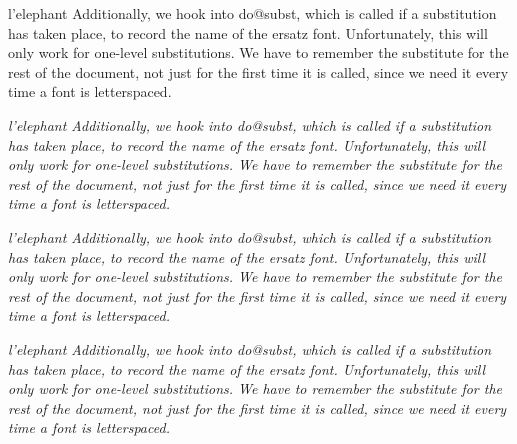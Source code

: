 \documentclass{article}
\makeatletter
\def\text{Additionally, we hook into do@subst, which is called if a substitution has taken place, to record the name of the ersatz font. Unfortunately, this will only work for one-level substitutions. We have to remember the substitute for the rest of the document, not just for the first time it is called, since we need it every time {a font is letterspaced}.}
\makeatother
\begin{document}
l'elephant \text

\textit{l'elephant \text}

\textsl{l'elephant \text}

\textit{l'elephant \text {}}
\end{document}
